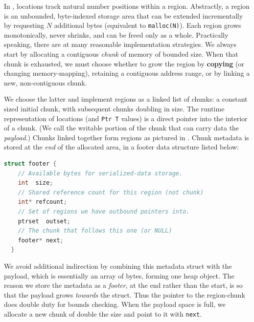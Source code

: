 \documentclass[showabstract,showacknowledgments,showpreface,showdedication]{iuphd}
\theoremstyle{nonumberplain}
\newcommand{\il}[1]{\lstinline[style=inline,mathescape=true];#1;}
\begin{document}
In \ourcalc, locations track natural number positions within a region.
Abstractly, a region is an unbounded, byte-indexed storage area that can be
extended incrementally by requesting $N$ additional bytes (equivalent to
\il{malloc(N)}).
%
Each region grows monotonically, never shrinks, and can be
freed only as a whole.
%
Practically speaking, there are at many reasonable implementation strategies.
%
We always start by allocating a contiguous {\em chunk} of memory of bounded
size.  When that chunk is exhausted, we must choose whether to grow the
region by {\bf copying} (or changing memory-mapping), retaining a contiguous
address range, or by linking a new, non-contiguous chunk.



We choose the latter and implement regions as a linked list of chunks: a
constant sized initial chunk, with subsequent chunks doubling in size.
%
The runtime representation of locations (and \il{Ptr T} values)
is a direct pointer into the interior of a chunk.
(We call the writable portion of the chunk that can carry data the {\em payload}.)
Chunks linked together form regions as pictured in
.  Chunk metadata is stored at the \emph{end} of the
allocated area, in a footer data structure listed below:
%
\begin{lstlisting}[language=C++]
  struct footer {
    // Available bytes for serialized-data storage.
    int  size;
    // Shared reference count for this region (not chunk)
    int* refcount;
    // Set of regions we have outbound pointers into.
    ptrset  outset;
    // The chunk that follows this one (or NULL)
    footer* next;
  }
\end{lstlisting}
We avoid additional indirection by combining this metadata struct with the
payload, which is essentially an array of bytes, forming one heap object.
The reason we store the metadata as a \emph{footer}, at the end rather than the
start, is so that the payload grows \emph{towards} the struct.  Thus the pointer
to the region-chunk does double duty for bounds checking.  When the payload
space is full, we allocate a new chunk of double the size and point to it with
\il{next}.
\end{document}
